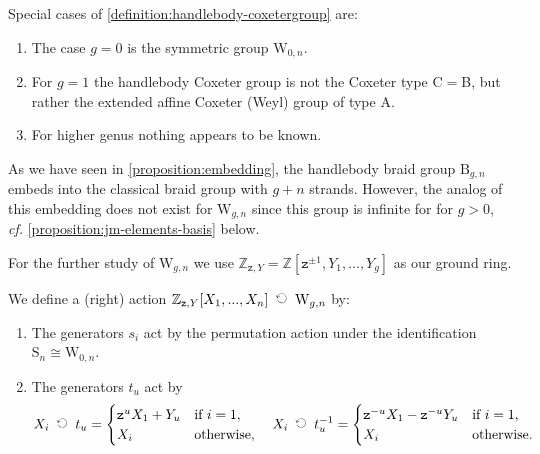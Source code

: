 \documentclass[a4paper,11pt]{amsart}
\newcommand{\cf}{\textsl{cf.}}
\renewcommand{\dots}{\text{...}}
\newcommand{\actsright}{\mathop{\,\;\raisebox{0ex}{\rotatebox{90}{$\circlearrowleft$}}\;\,}}
\newcommand{\setstuff}[1]{\mathrm{#1}}
\newcommand{\Z}{\mathbb{Z}}
\newcommand{\varsym}[1]{\mathtt{#1}}
\newcommand{\zvar}{\varsym{z}}
\newcommand{\Zf}{\Z_{\zvar,Y}}
\numberwithin{equation}{section}
\let\fullref\autoref
\begin{document}
\begin{remark}
Special cases of \fullref{definition:handlebody-coxetergroup} are:
\begin{enumerate}

\setlength\itemsep{0.15cm}

\item The case $g=0$ is the symmetric group $\setstuff{W}_{0,n}$.

\item For $g=1$ the handlebody Coxeter group is not the 
Coxeter type C$=$B, but rather the extended affine Coxeter (Weyl) group of type A.

\item For higher genus nothing appears to be known.

\end{enumerate}
\end{remark}

As we have seen in \fullref{proposition:embedding}, the handlebody braid 
group $\setstuff{B}_{g,n}$ embeds into the classical braid group with 
$g+n$ strands. However, the analog of this 
embedding does not exist for $\setstuff{W}_{g,n}$ since 
this group is infinite for 
for $g>0$, {\cf} \fullref{proposition:jm-elements-basis} below.

For the further study of $\setstuff{W}_{g,n}$ we use
$\Zf=\Z[\zvar^{\pm 1},Y_{1},\dots,Y_{g}]$ as our ground ring.

\begin{definition}\label{definition:action}
We define a (right) action $
\Zf[X_{1},\dots,X_{n}]\actsright\setstuff{W}_{g,n}$
by:
\begin{enumerate}

\setlength\itemsep{0.15cm}

\item The generators $s_{i}$ act by the permutation action under the identification 
$\setstuff{S}_{n}\cong\setstuff{W}_{0,n}$.

\item The generators $t_{u}$ act by
\begin{gather}\label{eq:action}
X_{i}\actsright t_{u}
=
\begin{cases}
\zvar^{u}X_{1}+Y_{u}&\text{if }i=1,
\\
X_{i}&\text{otherwise},
\end{cases}
\quad
X_{i}\actsright t_{u}^{-1}
=
\begin{cases}
\zvar^{-u}X_{1}-\zvar^{-u}Y_{u}&\text{if }i=1,
\\
X_{i}&\text{otherwise}.
\end{cases}
\end{gather}

\end{enumerate}
\end{definition}
\end{document}
